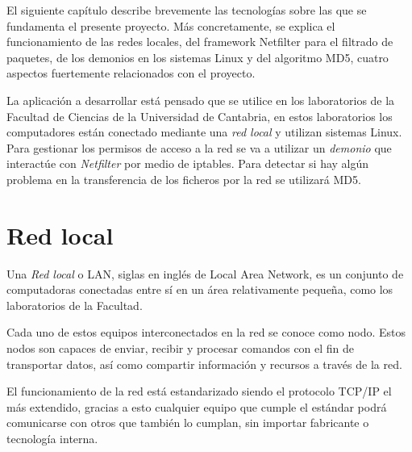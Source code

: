 ﻿%


\label{chap:introduction}


El siguiente cap\'itulo describe brevemente las tecnolog\'ias sobre las que se fundamenta el presente proyecto. M\'as concretamente, se explica el funcionamiento de las redes locales, del framework Netfilter para el filtrado de paquetes, de los demonios en los sistemas Linux\cite{linux:2004} y del algoritmo MD5, cuatro aspectos fuertemente relacionados con el proyecto.
\newline

La aplicación a desarrollar está pensado que se utilice en los laboratorios de la Facultad de Ciencias de la Universidad de Cantabria, en estos laboratorios los computadores están conectado mediante una \emph{red local} y utilizan sistemas Linux. Para gestionar los permisos de acceso a la red se va a utilizar un \emph{demonio} que interactúe con \emph{Netfilter} por medio de iptables. Para detectar si hay algún problema en la transferencia de los ficheros por la red se utilizará MD5.


\chaptertoc

\section{Red local}

Una \emph{Red local} o LAN\cite{redes:2004}, siglas en inglés de Local Area Network, es un conjunto de computadoras conectadas entre sí en un \'area relativamente peque\~na, como los laboratorios de la Facultad.
\newline

Cada uno de estos equipos interconectados en la red se conoce como nodo. Estos nodos son capaces de enviar, recibir y procesar comandos con el fin de transportar datos, así como compartir informaci\'on y recursos a través de la red.
\newline

El funcionamiento de la red está estandarizado siendo el protocolo TCP/IP \cite{TCPIP} el más extendido, gracias a esto cualquier equipo que cumple el estándar podrá comunicarse con otros que también lo cumplan, sin importar fabricante o tecnología interna.
\newline



